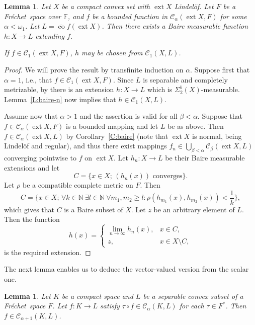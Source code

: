 \documentclass{amsart}
\numberwithin{equation}{section}
\newtheorem{lemma}[thm]{Lemma}
\theoremstyle{definition}
\def\C{\mathcal C}
\def\lin{Lindel\"of}
\def\co{\operatorname{co}}
\def\en{\mathbb N}
\def\ef{\mathbb F}
\def\ov{\overline}
\def \ext {\operatorname{ext}}
\newcommand{\setsep}{;\,}
\newcommand{\fr}{Fr\'echet\ }
\begin{document}
\begin{lemma}
\label{L:extension}
Let $X$ be a compact convex set with $\ext X$ \lin. Let $F$ be a \fr space over $\ef$,  and $f$ be a bounded function in $\C_\alpha(\ext X,F)$ for some $\alpha<\omega_1$. Let $L=\ov{\co}f(\ext X)$. Then there exists a  Baire
measurable function $h\colon X\to L$ extending $f$.

If $f\in\C_1(\ext X,F)$, $h$ may be chosen from $\C_1(X,L)$.
\end{lemma}

\begin{proof} We will prove the result by transfinite induction on $\alpha$. Suppose first that $\alpha=1$, i.e., that $f\in\C_1(\ext X,F)$. Since $L$ is separable and completely metrizable, by \cite[Theorem 30 and Proposition 28]{kalenda-spurny}
there is an extension $h:X\to L$ which is $\Sigma^b_2(X)$-measurable. Lemma~\ref{L:baire-n} now implies that $h\in\C_1(X,L)$.

Assume now that $\alpha>1$ and the assertion is valid for all $\beta<\alpha$. Suppose that $f\in\C_\alpha(\ext X,F)$ is a bounded mapping and let $L$ be as above. Then $f\in \C_\alpha(\ext X,L)$ by
Corollary~\ref{C:baire} (note that $\ext X$ is normal, being Lindel\"of and regular), and thus there exist mappings $f_n\in\bigcup_{\beta<\alpha}\C_\beta(\ext X,L)$ converging pointwise to $f$ on $\ext X$. Let $h_n\colon X\to L$ be their Baire measurable extensions and let
\[
C=\{x\in X\setsep (h_n(x))\text{ converges}\}.
\]
Let $\rho$ be a compatible complete metric on $F$. Then
\[
C=\{x\in X\setsep \forall k\in\en\ \exists l\in\en\ \forall m_1,m_2\ge l\colon \rho(h_{m_1}(x),h_{m_2}(x))<\frac1k\},
\]
which gives that $C$ is a Baire subset of $X$. Let $z$ be an arbitrary element of $L$. Then the function
\[
h(x)=\begin{cases}
\lim_{n\to \infty} h_n(x),& x\in C,\\
z,& x\in X\setminus C,
\end{cases}
\]
is the required extension.
\end{proof}

The next lemma enables us to deduce the vector-valued version from the scalar one.

\begin{lemma}
\label{L:meas}
Let $K$ be a compact space and $L$ be a separable convex subset of a \fr space $F$.
Let $f\colon K\to L$ satisfy $\tau\circ f\in \C_{\alpha}(K,L)$ for each $\tau\in F^*$. Then $f\in \C_{\alpha+1}(K,L)$.
\end{lemma}
\end{document}
